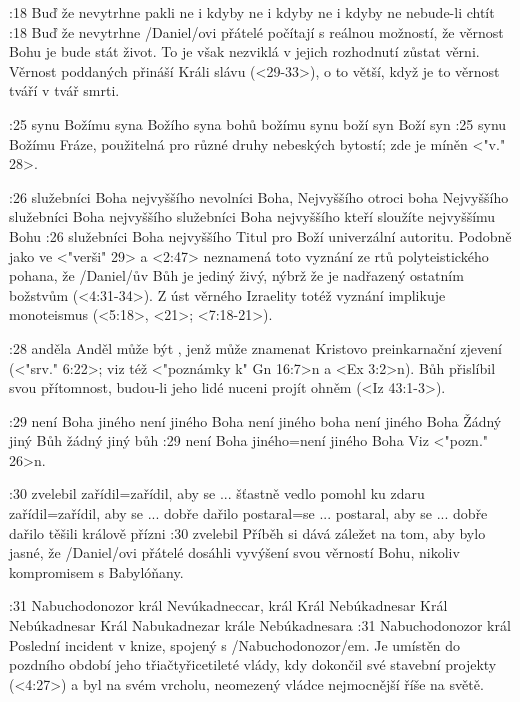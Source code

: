 :18
    {Buď že nevytrhne}  %
    {pakli ne} %
    {i kdyby ne}  %
    {i kdyby ne} %
    {i kdyby ne}  %
    {nebude-li chtít}  %
:18 {Buď že nevytrhne} \x/Daniel/ovi přátelé počítají s reálnou možností, že věrnost Bohu je bude stát život. To je však nezviklá v jejich rozhodnutí zůstat věrni. Věrnost poddaných přináší Králi slávu (<29-33>), o to větší, když je to věrnost tváří v tvář smrti.

:25
    {synu Božímu}  %
    {syna Božího} %
    {syna bohů}  %
    {božímu synu} %
    {boží syn}  %
    {Boží syn}  %
:25 {synu Božímu} Fráze, použitelná pro různé druhy nebeských bytostí; zde je míněn  <"v." 28>.

:26
    {služebníci Boha nejvyššího}  %
    {nevolníci Boha, Nejvyššího} %
    {otroci boha Nejvyššího}  %
    {služebníci Boha nejvyššího} %
    {služebníci Boha nejvyššího}  %
    {kteří sloužíte nejvyššímu Bohu}  %
:26 {služebníci Boha nejvyššího} Titul pro Boží univerzální autoritu. Podobně jako ve
        <"verši" 29> a <2:47> neznamená toto vyznání ze rtů polyteistického pohana, 
        že \x/Daniel/ův Bůh je jediný živý, nýbrž že je nadřazený ostatním božstvům (<4:31-34>).
        Z úst věrného Izraelity totéž vyznání implikuje monoteismus (<5:18>, <21>; <7:18-21>).

:28 {anděla} Anděl může být , jenž může znamenat Kristovo preinkarnační zjevení (<"srv." 6:22>; viz též <"poznámky k" Gn 16:7>n a <Ex 3:2>n). Bůh přislíbil svou přítomnost, budou-li jeho lidé nuceni projít ohněm (<Iz 43:1-3>). 

:29
    {není Boha jiného}  %
    {není jiného Boha} %
    {není jiného boha}  %
    {není jiného Boha} %
    {Žádný jiný Bůh}  %
    {žádný jiný bůh}  %
:29 {není Boha jiného}={není jiného Boha} Viz <"pozn." 26>n.

:30
    {zvelebil}  %
    {zařídil}={zařídil, aby se ... šťastně vedlo} %
    {pomohl ku zdaru}  %
    {zařídil}={zařídil, aby se ... dobře dařilo} %
    {postaral}={se ... postaral, aby se ... dobře dařilo}  %
    {těšili králově přízni}  %
 :30 {zvelebil} Příběh si dává záležet na tom, aby bylo jasné, že \x/Daniel/ovi přátelé dosáhli vyvýšení svou věrností  Bohu, nikoliv kompromisem s Babylóňany. 
 
:31  
    {Nabuchodonozor král}   %
    {Nevúkadneccar, král}   %
    {Král Nebúkadnesar}   %
    {Král Nebúkadnesar}   %
    {Král Nabukadnezar}   %
    {krále Nebúkadnesara}   %
:31 {Nabuchodonozor král} Poslední incident v knize, spojený s \x/Nabuchodonozor/em. Je umístěn do pozdního období jeho třiačtyřicetileté vlády, kdy dokončil své stavební projekty (<4:27>) a byl na svém vrcholu, neomezený vládce nejmocnější říše na světě. 

